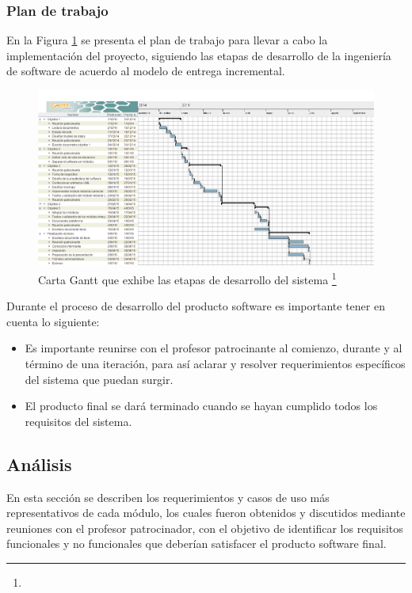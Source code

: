 	
	
	\subsubsection{Plan de trabajo}
	
	En la Figura \ref{figura_cartaGantt} se presenta el plan de trabajo para llevar a cabo la implementación del proyecto, siguiendo las etapas de desarrollo de la ingeniería de software de acuerdo al modelo de entrega incremental.
	
	\begin{figure}[H]
		\centering
		\includegraphics[width=1\textwidth]{images/Capitulo_3/carta_gantt.png}
		\caption[Carta Gantt que exhibe las etapas de desarrollo del sistema]{Carta Gantt que exhibe las etapas de desarrollo del sistema \footnote{}}
		\label{figura_cartaGantt}
	\end{figure}

	Durante el proceso de desarrollo del producto software es importante tener en cuenta lo siguiente:
	\begin{itemize}
		\item Es importante reunirse con el profesor patrocinante al comienzo, durante y al
		término de una iteración, para así aclarar y resolver requerimientos específicos del
		sistema que puedan surgir.
		\item El producto final se dará terminado cuando se hayan cumplido todos los requisitos
		del sistema.
	\end{itemize}

\subsection{Análisis}
	En esta sección se describen los requerimientos y casos de uso más representativos de cada módulo, los cuales fueron obtenidos y discutidos mediante  reuniones con el profesor patrocinador, con el objetivo de identificar los requisitos funcionales y no funcionales que deberían satisfacer el producto software final.
		
